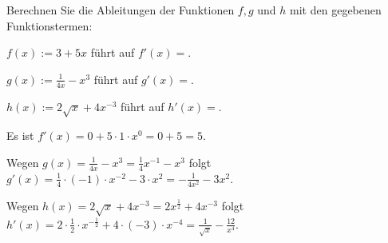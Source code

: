 \begin{MExercises}

\begin{MExercise}
Berechnen Sie die Ableitungen der Funktionen $f,g$ und $h$ mit den gegebenen Funktionstermen:
\begin{MExerciseItems}
\item $f(x) := 3 + 5 x$
führt auf $f'(x) = $.
%
\item $g(x) := \frac{1}{4 x} - x^3$
führt auf $g'(x) = $.
%
\item $h(x) := 2 \sqrt{x} + 4 x^{-3}$
führt auf $h'(x) = $.
\end{MExerciseItems}
\begin{MHint}{\iSolution}
 \begin{MExerciseItems}
  \item Es ist $f'(x) = 0 + 5 \cdot 1 \cdot x^0 = 0 + 5 = 5$.
  \item Wegen $g(x) = \frac{1}{4x} - x^3 = \frac14 x^{-1} - x^3$ folgt
  $g'(x) = \frac14 \cdot (-1) \cdot x^{-2} - 3 \cdot x^2 = - \frac{1}{4 x^2} - 3 x^2$.
  \item Wegen $h(x) = 2 \sqrt{x} + 4 x^{-3} = 2 x^\frac12 + 4 x^{-3}$ folgt
  $h'(x) = 2 \cdot \frac12 \cdot x^{-\frac12} + 4 \cdot (-3) \cdot x^{-4} = \frac{1}{\sqrt{x}} - \frac{12}{x^4}$.
 \end{MExerciseItems}
\end{MHint}
\end{MExercise}


\end{MExercises}
